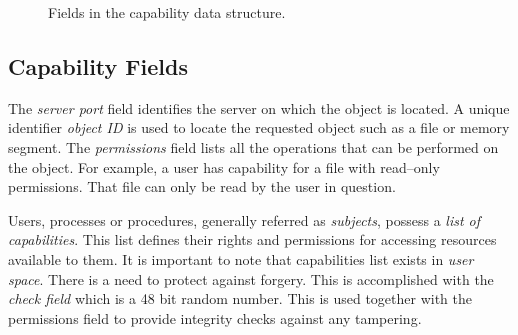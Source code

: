 \documentclass{sig-alternate-10pt}
\begin{document}
\begin{figure*}
\vspace{0.5cm}
\centering
{}
\caption{Fields in the capability data structure.}
\label{capability-DS}
\end{figure*}

\subsection{Capability Fields}

The \emph{server port} field identifies the server on which the object is located. A unique identifier \emph{object ID} is used to locate the requested object such as a file or memory segment. The \emph{permissions} field lists all the operations that can be performed on the object. For example, a user has capability for a file with read--only permissions. That file can only be read by the user in question.

Users, processes or procedures, generally referred as \emph{subjects}, possess a \emph{list of capabilities}. This list defines their rights and permissions for accessing resources available to them. It is important to note that capabilities list exists in \emph{user space}. There is a need to protect against forgery. This is accomplished with the \emph{check field} which is a 48 bit random number. This is used together with the permissions field to provide integrity checks against any tampering.
\end{document}
